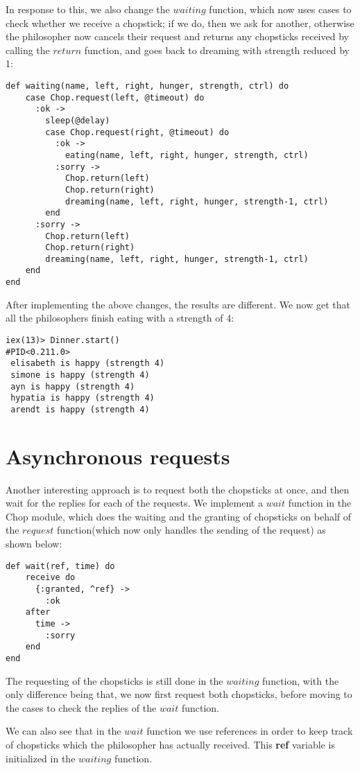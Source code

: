 \documentclass[a4paper,11pt]{article}
\begin{document}
In response to this, we also change the $waiting$ function, which now uses cases to check whether we receive a chopstick; if we do, then we ask for another, otherwise the philosopher now cancels their request and returns any chopsticks received by calling the $return$ function, and goes back to dreaming with strength reduced by 1:
\begin{verbatim}
def waiting(name, left, right, hunger, strength, ctrl) do
    case Chop.request(left, @timeout) do
      :ok ->
        sleep(@delay)
        case Chop.request(right, @timeout) do
          :ok ->
            eating(name, left, right, hunger, strength, ctrl)
          :sorry ->
            Chop.return(left)
            Chop.return(right)
            dreaming(name, left, right, hunger, strength-1, ctrl)
        end
      :sorry ->
        Chop.return(left)
        Chop.return(right)
        dreaming(name, left, right, hunger, strength-1, ctrl)
    end
end
\end{verbatim}
After implementing the above changes, the results are different. We now get that all the philosophers finish eating with a strength of 4:
\begin{verbatim}
iex(13)> Dinner.start()
#PID<0.211.0>
 elisabeth is happy (strength 4)
 simone is happy (strength 4)
 ayn is happy (strength 4)
 hypatia is happy (strength 4)
 arendt is happy (strength 4)
\end{verbatim}

\section*{Asynchronous requests}
Another interesting approach is to request both the chopsticks at once, and then wait for the replies for each of the requests. We implement a $wait$ function in the Chop module, which does the waiting and the granting of chopsticks on behalf of the $request$ function(which now only handles the sending of the request) as shown below:
\begin{verbatim}
def wait(ref, time) do
    receive do
      {:granted, ^ref} ->
        :ok
    after
      time ->
        :sorry
    end
end
\end{verbatim}
The requesting of the chopsticks is still done in the $waiting$ function, with the only difference being that, we now first request both chopsticks, before moving to the cases to check the replies of the $wait$ function. 

We can also see that in the $wait$ function we use references in order to keep track of chopsticks which the philosopher has actually received. This \textbf{ref} variable is initialized in the $waiting$ function.
\end{document}
